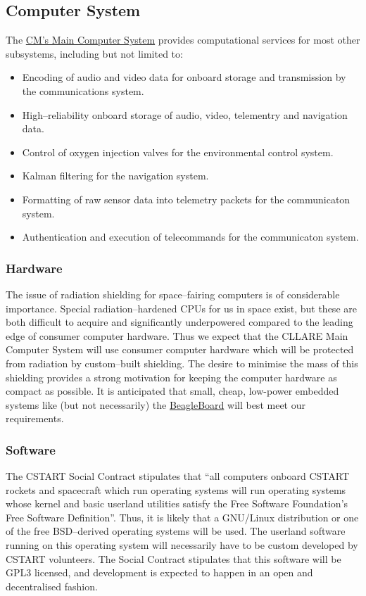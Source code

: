 \documentclass{report}
\begin{document}
\subsection{Computer System}

The \href{http://cstart.org/wiki/CLLARE_Main_Computer_System}{CM's Main Computer System} provides computational services for most other subsystems, including but not limited to:
\begin{itemize}
\item Encoding of audio and video data for onboard storage and transmission by the communications system.
\item High--reliability onboard storage of audio, video, telementry and navigation data.
\item Control of oxygen injection valves for the environmental control system.
\item Kalman filtering for the navigation system.
\item Formatting of raw sensor data into telemetry packets for the communicaton system.
\item Authentication and execution of telecommands for the communicaton system.
\end{itemize}

\subsubsection{Hardware}

The issue of radiation shielding for space--fairing computers is of considerable importance.  Special radiation--hardened CPUs for us in space exist, but these are both difficult to acquire and significantly underpowered compared to the leading edge of consumer computer hardware.  Thus we expect that the CLLARE Main Computer System will use consumer computer hardware which will be protected from radiation by custom--built shielding.  The desire to minimise the mass of this shielding provides a strong motivation for keeping the computer hardware as compact as possible.  It is anticipated that small, cheap, low-power embedded systems like (but not necessarily) the \href{http://beagleboard.org}{BeagleBoard} will best meet our requirements.

\subsubsection{Software}

The CSTART Social Contract stipulates that ``all computers onboard CSTART rockets and spacecraft which run operating systems will run operating systems whose kernel and basic userland utilities satisfy the Free Software Foundation's Free Software Definition''.  Thus, it is likely that a GNU/Linux distribution or one of the free BSD--derived operating systems will be used.  The userland software running on this operating system will necessarily have to be custom developed by CSTART volunteers.  The Social Contract stipulates that this software will be GPL3 licensed, and development is expected to happen in an open and decentralised fashion.
\end{document}
